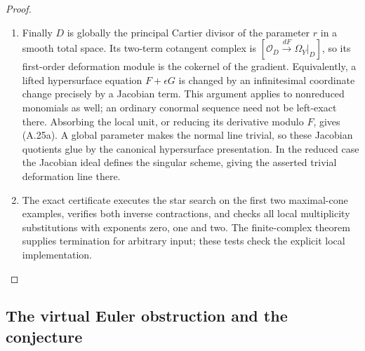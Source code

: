 \begin{proof}
\begin{enumerate}[label=\arabic*.,leftmargin=*]
\item Finally $D$ is globally the principal Cartier
divisor of the parameter $r$ in a smooth total
space. Its two-term cotangent complex is
$[\mathcal O_D\xrightarrow{dF}\Omega_Y|_D]$,
so its first-order deformation module is the
cokernel of the gradient. Equivalently, a lifted
hypersurface equation $F+\epsilon G$ is changed by
an infinitesimal coordinate change precisely by a
Jacobian term. This argument applies to nonreduced
monomials as well; an ordinary conormal sequence
need not be left-exact there. Absorbing the local unit, or reducing its
derivative modulo $F$, gives (A.25a). A global
parameter makes the normal line trivial, so these
Jacobian quotients glue by the canonical
hypersurface presentation. In the reduced case
the Jacobian ideal defines the singular scheme,
giving the asserted trivial deformation line there.

\item The exact certificate
executes the star search on the first two
maximal-cone examples, verifies both inverse
contractions, and checks all local multiplicity
substitutions with exponents zero, one and two.
The finite-complex theorem supplies termination for
arbitrary input; these tests check the explicit
local implementation.
\end{enumerate}
\end{proof}


\subsection{The virtual Euler obstruction and the conjecture}\label{push:section:A.3}

